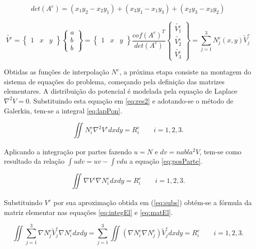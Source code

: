 \documentclass[
    12pt,               %
    openright,          %
    oneside,
    a4paper,            %
    english,            %
    french,             %
    spanish,            %
    brazil              %
    ]{abntex2}
\begin{document}
\begin{apendicesenv}
\begin{equation}
\label{eq:det}
det(A^e)
=
(x_1y_2 - x_2y_1)+
(x_3y_1 - x_1y_3)+
(x_2y_3 - x_3y_2)
\end{equation}

\begin{equation}
\label{eq:subs}
\tilde{V^e} = 
\begin{Bmatrix}
1 & x & y
\end{Bmatrix}
\begin{Bmatrix}
a \\ b \\ b
\end{Bmatrix}
= \begin{Bmatrix}
1 & x & y
\end{Bmatrix}
\frac{cof(A^e)^T}{det(A^e)}
\begin{Bmatrix}
\tilde{V^e_1}  \\
\tilde{V^e_2} \\
\tilde{V^e_3}
\end{Bmatrix}
=
\sum_{j=1}^{3}{N_j^e (x, y) \tilde{V}_j^e}
\end{equation}

Obtidas as funções de interpolação $N^e$, a próxima etapa consiste  na montagem do sistema de equações do problema, começando pela definição das matrizes elementares. A distribuição do potencial é modelada pela equação de Laplace $\nabla^2 V = 0$. Substituindo esta equação em \ref{eq:res2} e adotando-se o método de Galerkin, tem-se a integral \ref{eq:lapPon}.

\begin{equation}
\label{eq:lapPon}
\iint_{}{N^e_i \nabla^2 V^e dx dy} = R^e_i \qquad i = 1,2,3.
\end{equation}  

Aplicando a integração por partes fazendo $u = N$ e $dv = nabla^2 V$, tem-se como resultado da relação $\int u dv = uv - \int vdu$ a equação \ref{eq:posParte}.

\begin{equation}
\label{eq:posParte}
\iint_{}{\nabla V^e \nabla N^e_i dx dy} = R^e_i \qquad i = 1,2,3.
\end{equation} 

Substituindo $V^e$ por sua aproximação obtida em (\ref{eq:subs}) obtém-se a fórmula da matriz elementar nas equações \ref{eq:integEl} e \ref{eq:matEl}.

\begin{equation}
\label{eq:integEl}
\iint_{}{ \sum_{j=1}^{3}{\nabla N_j^e \tilde{V}_j^e} \nabla N^e_i dx dy} 
=
\sum_{j=1}^{3}\iint_{}{\left(\nabla N^e_i \nabla N_j^e \right)  \tilde{V}_j^e dx dy}
= R^e_i \qquad i = 1,2,3.
\end{equation} 


\end{apendicesenv}
\end{document}
